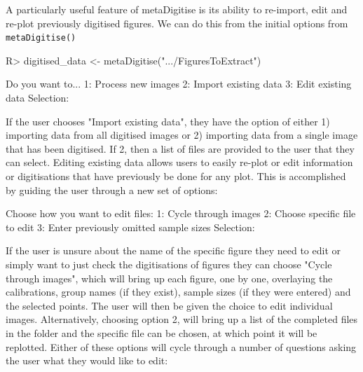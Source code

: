 \documentclass[12pt]{article}
\newcommand{\fct}[1]{\texttt{#1()}}
\newcommand{\pkg}[1]{{\fontseries{b}\selectfont #1}}
\begin{document}
A particularly useful feature of \pkg{metaDigitise} is its ability to re-import, edit and re-plot previously digitised figures. We can do this from the initial options from \fct{metaDigitise}


\begin{CodeChunk}
\begin{CodeInput}
R> digitised_data <- metaDigitise(".../FiguresToExtract")
\end{CodeInput}
\begin{CodeOutput}
    Do you want to...
1: Process new images
2: Import existing data
3: Edit existing data
Selection: 
\end{CodeOutput}
\end{CodeChunk}

If the user chooses "Import existing data", they have the option of either 1) importing data from all digitised images or 2) importing data from a single image that has been digitised. If 2, then a list of files are provided to the user that they can select. Editing existing data allows users to easily re-plot or edit information or digitisations that have previously be done for any plot. This is accomplished by guiding the user through a new set of options:

\begin{CodeChunk}
\begin{CodeOutput}
Choose how you want to edit files:
1: Cycle through images
2: Choose specific file to edit
3: Enter previously omitted sample sizes
Selection: 
\end{CodeOutput}
\end{CodeChunk}

If the user is unsure about the name of the specific figure they need to edit or simply want to just check the digitisations of figures they can choose "Cycle through images", which will bring up each figure, one by one, overlaying the calibrations, group names (if they exist), sample sizes (if they were entered) and the selected points. The user will then be given the choice to edit individual images. Alternatively, choosing option 2, will bring up a list of the completed files in the folder and the specific file can be chosen, at which point it will be replotted. Either of these options will cycle through a number of questions asking the user what they would like to edit:
\end{document}
